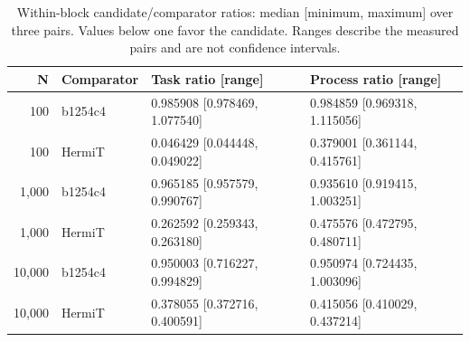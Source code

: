 \begin{table}[ht]
\caption{Within-block candidate/comparator ratios: median [minimum, maximum] over three pairs. Values below one favor the candidate. Ranges describe the measured pairs and are not confidence intervals.}
\label{tab:hermit-ratios}
\centering\small
\begin{tabular}{@{}rlll@{}}
\toprule
N & Comparator & Task ratio [range] & Process ratio [range] \\
\midrule
100 & b1254c4 & 0.985908 [0.978469, 1.077540] & 0.984859 [0.969318, 1.115056] \\
100 & HermiT & 0.046429 [0.044448, 0.049022] & 0.379001 [0.361144, 0.415761] \\
1,000 & b1254c4 & 0.965185 [0.957579, 0.990767] & 0.935610 [0.919415, 1.003251] \\
1,000 & HermiT & 0.262592 [0.259343, 0.263180] & 0.475576 [0.472795, 0.480711] \\
10,000 & b1254c4 & 0.950003 [0.716227, 0.994829] & 0.950974 [0.724435, 1.003096] \\
10,000 & HermiT & 0.378055 [0.372716, 0.400591] & 0.415056 [0.410029, 0.437214] \\
\bottomrule
\end{tabular}
\end{table}
